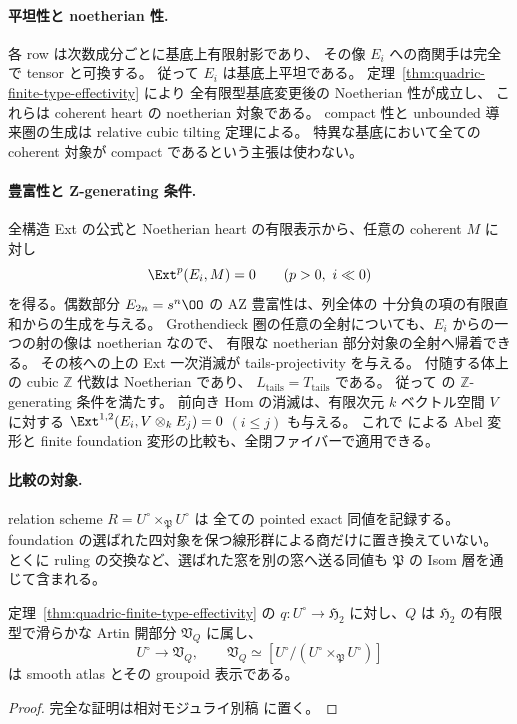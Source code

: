 \paragraph{平坦性と noetherian 性.}
各 row は次数成分ごとに基底上有限射影であり、
その像 $E_i$ への商関手は完全で tensor と可換する。
従って $E_i$ は基底上平坦である。
定理~\ref{thm:quadric-finite-type-effectivity} により
全有限型基底変更後の Noetherian 性が成立し、
これらは coherent heart の noetherian 対象である。
compact 性と unbounded 導来圏の生成は relative cubic tilting 定理による。
特異な基底において全ての coherent 対象が compact であるという主張は使わない。

\paragraph{豊富性と Z-generating 条件.}
全構造 Ext の公式と Noetherian heart の有限表示から、任意の coherent $M$ に対し
\[
 \Ext^p(E_i,M)=0\qquad(p>0,\ i\ll0)
\]
を得る。偶数部分 $E_{2n}=s^n\OO$ の AZ 豊富性は、列全体の
十分負の項の有限直和からの生成を与える。
Grothendieck 圏の任意の全射についても、$E_i$ からの一つの射の像は noetherian なので、
有限な noetherian 部分対象の全射へ帰着できる。
その核への上の Ext 一次消滅が tails-projectivity を与える。
付随する体上の cubic $\mathbb Z$ 代数は Noetherian であり、
$L_{\mathrm{tails}}=T_{\mathrm{tails}}$ である。
従って \cite[Corollary 3.16]{DeDekenLowen2011} の $\mathbb Z$-generating 条件を満たす。
前向き Hom の消滅は、有限次元 $k$ ベクトル空間 $V$ に対する
$\Ext^{1,2}(E_i,V\otimes_k E_j)=0$ $(i\leq j)$ も与える。
これで \cite[Theorems 4.5 and 5.15]{DeDekenLowen2011} による Abel 変形と
finite foundation 変形の比較も、全閉ファイバーで適用できる。

\paragraph{比較の対象.}
relation scheme $R=U^\circ\times_{\mathfrak P}U^\circ$ は
全ての pointed exact 同値を記録する。
foundation の選ばれた四対象を保つ線形群による商だけに置き換えていない。
とくに ruling の交換など、選ばれた窓を別の窓へ送る同値も
$\mathfrak P$ の Isom 層を通じて含まれる。

\begin{corollary}
\label{cor:quadric-effective-smooth-neighborhood}
定理~\ref{thm:quadric-finite-type-effectivity} の
$q:U^\circ\to\mathfrak H_2$ に対し、$Q$ は $\mathfrak H_2$ の有限型で滑らかな Artin 開部分
$\mathfrak V_Q$ に属し、
\[
 U^\circ\longrightarrow\mathfrak V_Q,
 \qquad
 \mathfrak V_Q\simeq
 [U^\circ/(U^\circ\times_{\mathfrak P}U^\circ)]
\]
は smooth atlas とその groupoid 表示である。
\end{corollary}
\begin{proof}
完全な証明は相対モジュライ別稿 \cite[効果的foundationの滑らかな局所atlas]{QuadricModuli2026} に置く。
\end{proof}

